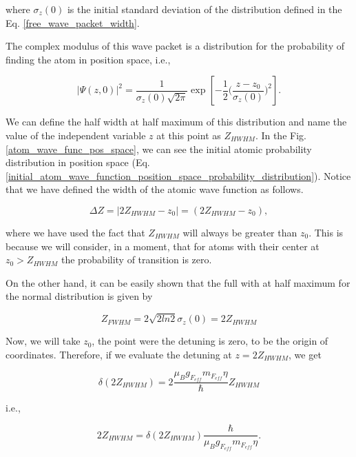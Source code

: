 \documentclass{article}
\begin{document}
where $\sigma_{z}(0)$ is the initial standard deviation of the distribution defined in the Eq. \ref{free_wave_packet_width}.

The complex modulus of this wave packet is a distribution for the probability of finding the atom in position space, i.e.,

\begin{equation}\label{initial_atom_wave_function_position_space_probability_distribution}
    |\Psi (z, 0)|^{2} = \frac{1}{\sigma_{z}(0) \sqrt{2 \pi}} \exp \left[-\frac{1}{2}\bigg(\frac{z-z_{0}}{\sigma_{z}(0)}\bigg)^{2} \right].
\end{equation}

We can define the half width at half maximum of this distribution and name the value of the independent variable $z$ at this point as $Z_{HWHM}$. In the Fig. \ref{atom_wave_func_pos_space}, we can see the initial atomic probability distribution in position space (Eq. \ref{initial_atom_wave_function_position_space_probability_distribution}). Notice that we have defined the width of the atomic wave function as follows.

\begin{equation}\label{width_atomic_wave_function}
  \Delta Z = |2Z_{HWHM} - z_{0}| = (2Z_{HWHM} - z_{0}),
\end{equation}

where we have used the fact that $Z_{HWHM}$ will always be greater than $z_{0}$. This is because we will consider, in a moment, that for atoms with their center at $z_{0} > Z_{HWHM}$ the probability of transition is zero.

On the other hand, it can be easily shown that the full with at half maximum for the normal distribution is given by

\begin{equation}\label{FWHM_normal_distribution}
Z_{FWHM} = 2\sqrt{2ln2} \sigma_{z}(0) = 2 Z_{HWHM}
\end{equation}

Now, we will take $z_{0}$, the point were the detuning is zero, to be the origin of coordinates. Therefore, if we evaluate the detuning at $z = 2Z_{HWHM}$, we get

\begin{equation}
  \delta (2Z_{HWHM}) = 2\frac{\mu_{B} g_{F_{eff}} m_{F_{eff}} \eta}{\hbar} Z_{HWHM}
\end{equation}

i.e.,

\begin{equation}\label{position_at_zhwhm}
  2Z_{HWHM} = \delta (2Z_{HWHM}) \frac{\hbar}{\mu_{B} g_{F_{eff}} m_{F_{eff}} \eta}.
\end{equation}
\end{document}
